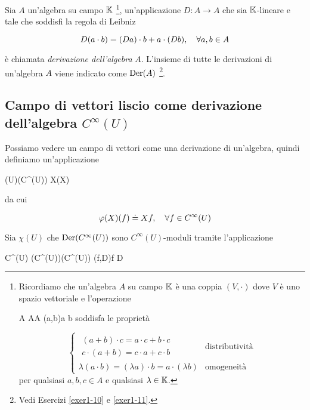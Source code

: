 Sia $ A $ un'algebra su campo $ \mathbb{K} $
	\footnote{%
		Ricordiamo che un'algebra $ A $ su campo $ \mathbb{K} $ è una coppia $ (V, \cdot) $ dove $ V $ è uno spazio vettoriale e l'operazione
		
		\maps{\cdot}
			{A \times A}{A}
			{(a,b)}{a \cdot b}
		soddisfa le proprietà
		
		\begin{equation*}
			\begin{cases}
				\begin{split}
					(a + b) \cdot c = a \cdot c + b \cdot c \\
					c \cdot (a + b) = c \cdot a + c \cdot b
				\end{split} & \text{distributività} \\
				\lambda (a \cdot b) = (\lambda a) \cdot b = a \cdot (\lambda b) & \text{omogeneità}
			\end{cases}
		\end{equation*}
		per qualsiasi $ a,b,c \in A $ e qualsiasi $ \lambda \in \mathbb{K} $.%
}, un'applicazione $ D : A \to A $ che sia $ \mathbb{K} $-lineare e tale che soddisfi la regola di Leibniz

\begin{equation}
	D (a \cdot b) = (D a) \cdot b + a \cdot (D b) \qcomma \forall a, b \in A
\end{equation}

è chiamata \textit{derivazione dell'algebra} $ A $. L'insieme di tutte le derivazioni di un'algebra $ A $ viene indicato come $ \operatorname{Der}(A) $
\footnote{%
	Vedi Esercizi \ref{exer1-10} e \ref{exer1-11}.%
}.

\subsection{Campo di vettori liscio come derivazione dell'algebra $ C^{\infty}(U) $}

Possiamo vedere un campo di vettori come una derivazione di un'algebra, quindi definiamo un'applicazione

\map{\varphi}
	{\chi(U)}{\der(C^{\infty}(U))}
	{X}{\varphi(X)}

da cui

\begin{equation}
	\varphi(X) (f) \doteq X f \qcomma \forall f \in C^{\infty}(U)
\end{equation}

Sia $ \chi(U) $ che $ \operatorname{Der}(C^{\infty}(U)) $ sono $ C^{\infty}(U) $-moduli tramite l'applicazione

\map{\cdot}
	{C^{\infty}(U) \times \der(C^{\infty}(U))}{\der(C^{\infty}(U))}
	{(f,D)}{f D}

